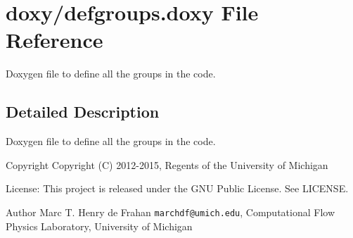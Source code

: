 \section{doxy/defgroups.doxy File Reference}
\label{defgroups_8doxy}


Doxygen file to define all the groups in the code.  




\subsection{Detailed Description}
Doxygen file to define all the groups in the code. \begin{DoxyCopyright}{Copyright}
Copyright (C) 2012-\/2015, Regents of the University of Michigan 
\end{DoxyCopyright}
\begin{DoxyParagraph}{License\-:}
This project is released under the G\-N\-U Public License. See L\-I\-C\-E\-N\-S\-E. 
\end{DoxyParagraph}
\begin{DoxyAuthor}{Author}
Marc T. Henry de Frahan {\tt marchdf@umich.\-edu}, Computational Flow Physics Laboratory, University of Michigan 
\end{DoxyAuthor}
